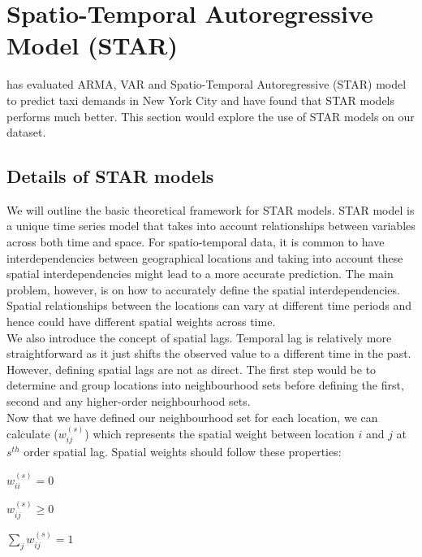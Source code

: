 \documentclass[nonblindrev,msom]{informs3} %
\begin{document}
\newpage

\section{Spatio-Temporal Autoregressive Model (STAR)}

\cite{Abolfazl2017} has evaluated ARMA, VAR and Spatio-Temporal Autoregressive (STAR) model to predict taxi demands in New York City and have found that STAR models performs much better. This section would explore the use of STAR models on our dataset. 

\subsection{Details of STAR models}

\noindent We will outline the basic theoretical framework for STAR models. STAR model is a unique time series model that takes into account relationships between variables across both time and space. For spatio-temporal data, it is common to have interdependencies between geographical locations and taking into account these spatial interdependencies might lead to a more accurate prediction. The main problem, however, is on how to accurately define the spatial interdependencies. Spatial relationships between the locations can vary at different time periods and hence could have different spatial weights across time.  \\

\noindent We also introduce the concept of spatial lags. Temporal lag is relatively more straightforward as it just shifts the observed value to a different time in the past. However, defining spatial lags are not as direct. The first step would be to determine and group locations into neighbourhood sets before defining the first, second and any higher-order neighbourhood sets.  \\

\noindent Now that we have defined our neighbourhood set for each location, we can calculate ($w_{ij}^{(s)}$) which represents the spatial weight between location $i$ and $j$ at $s^{th}$ order spatial lag. Spatial weights should follow these properties: 

\begin{center}

	$\displaystyle w_{ii}^{(s)} = 0$
	
    $\displaystyle w_{ij}^{(s)} \geq 0$
    
    $\displaystyle \sum_{j} w_{ij}^{(s)} = 1$
\end{center}
\end{document}
